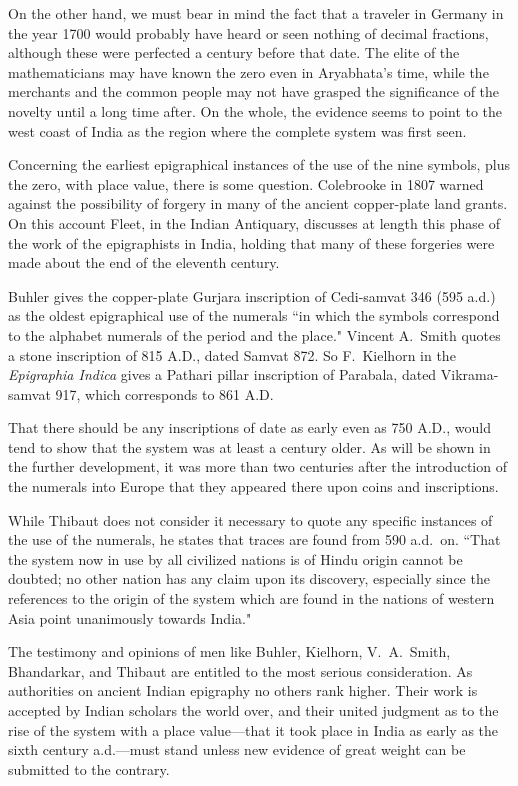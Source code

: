 \documentclass[11pt,a4paper]{article}
\begin{document}
On the other hand, we must bear in mind the fact that a traveler in Germany in the year 1700 would probably have heard or seen nothing of decimal fractions, although these were perfected a century before that date. The elite of the mathematicians may have known the zero even in Aryabhata's time, while the merchants and the common people may not have grasped the significance of the novelty until a long time after. On the whole, the evidence seems to point to the west coast of India as the region where the complete system was first seen.

Concerning the earliest epigraphical instances of the use of the nine symbols, plus the zero, with place value, there is some question. Colebrooke in 1807 warned against the possibility of forgery in many of the ancient copper-plate land grants. On this account Fleet, in the Indian Antiquary, discusses at length this phase of the work of the epigraphists in India, holding that many of these forgeries were made about the end of the eleventh century.

Buhler gives the copper-plate Gurjara inscription of Cedi-samvat 346 (595 a.d.) as the oldest epigraphical use of the numerals ``in which the symbols correspond to the alphabet numerals of the period and the place." Vincent A.~Smith quotes a stone inscription of 815 A.D., dated Samvat 872. So F.~Kielhorn in the \textit{Epigraphia Indica} gives a Pathari pillar inscription of Parabala, dated Vikrama-samvat 917, which corresponds to 861 A.D.

That there should be any inscriptions of date as early even as 750 A.D., would tend to show that the system was at least a century older. As will be shown in the further development, it was more than two centuries after the introduction of the numerals into Europe that they appeared there upon coins and inscriptions.

While Thibaut does not consider it necessary to quote any specific instances of the use of the numerals, he states that traces are found from 590 a.d.\ on. ``That the system now in use by all civilized nations is of Hindu origin cannot be doubted; no other nation has any claim upon its discovery, especially since the references to the origin of the system which are found in the nations of western Asia point unanimously towards India."

The testimony and opinions of men like Buhler, Kielhorn, V.~A.~Smith, Bhandarkar, and Thibaut are entitled to the most serious consideration. As authorities on ancient Indian epigraphy no others rank higher. Their work is accepted by Indian scholars the world over, and their united judgment as to the rise of the system with a place value---that it took place in India as early as the sixth century a.d.---must stand unless new evidence of great weight can be submitted to the contrary.
\end{document}
